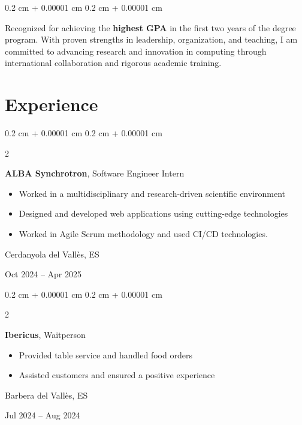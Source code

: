 \documentclass[10pt, letterpaper]{article}
\newenvironment{highlights}{
    \begin{itemize}[
        topsep=0.10 cm,
        parsep=0.10 cm,
        partopsep=0pt,
        itemsep=0pt,
        leftmargin=0.4 cm + 10pt
    ]
}{
    \end{itemize}
} %
\newenvironment{onecolentry}{
    \begin{adjustwidth}{
        0.2 cm + 0.00001 cm
    }{
        0.2 cm + 0.00001 cm
    }
}{
    \end{adjustwidth}
} %
\newenvironment{twocolentry}[2][]{
    \onecolentry
    \def\secondColumn{#2}
    \setcolumnwidth{\fill, 4.5 cm}
    \begin{paracol}{2}
}{
    \switchcolumn \raggedleft \secondColumn
    \end{paracol}
    \endonecolentry
} %
\begin{document}
        \vspace{0.2 cm}

        \begin{onecolentry}
            Recognized for achieving the \textbf{highest GPA} in the first two years of the degree program. With proven strengths in leadership, organization, and teaching, I am committed to advancing research and innovation in computing through international collaboration and rigorous academic training.
        \end{onecolentry}


    \section{Experience}
        \begin{twocolentry}{
            Cerdanyola del Vallès, ES

            Oct 2024 – Apr 2025
        }
            \textbf{ALBA Synchrotron}, Software Engineer Intern
            \begin{highlights}
                \item Worked in a multidisciplinary and research-driven scientific environment
                \item Designed and developed web applications using cutting-edge technologies
                \item Worked in Agile Scrum methodology and used CI/CD technologies.
            \end{highlights}
        \end{twocolentry}

        \vspace{0.2 cm}

        \begin{twocolentry}{
            Barbera del Vallès, ES

            Jul 2024 – Aug 2024
        }
            \textbf{Ibericus}, Waitperson
            \begin{highlights}
                \item Provided table service and handled food orders
                \item Assisted customers and ensured a positive experience
            \end{highlights}
        \end{twocolentry}

        \vspace{0.2 cm}
\end{document}
